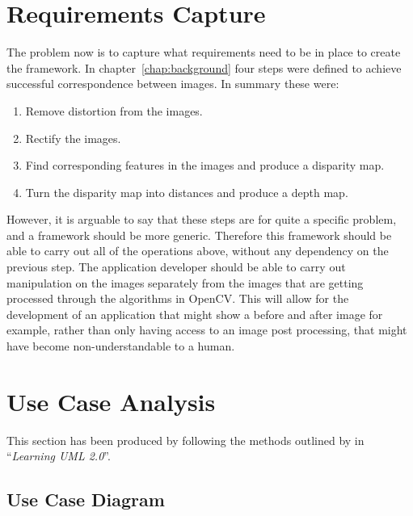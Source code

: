 \documentclass[11pt,oneside]{report}
\begin{document}
		\section{Requirements Capture}
			The problem now is to capture what requirements need to be in place to create the framework.
			In chapter~\ref{chap:background} four steps were defined to achieve successful correspondence between images.
			In summary these were:
			\begin{enumerate}
				\item Remove distortion from the images.
				\item Rectify the images.
				\item Find corresponding features in the images and produce a disparity map.
				\item Turn the disparity map into distances and produce a depth map.
			\end{enumerate}
			However, it is arguable to say that these steps are for quite a specific problem, and a framework should be more generic.
			Therefore this framework should be able to carry out all of the operations above, without any dependency on the previous step.
			The application developer should be able to carry out manipulation on the images separately from the images that are getting processed through the algorithms in OpenCV.
			This will allow for the development of an application that might show a before and after image for example, rather than only having access to an image post processing, that might have become non-understandable to a human.
			
		\section{Use Case Analysis}
		This section has been produced by following the methods outlined by  in ``\textit{Learning UML 2.0}''.
			\subsection{Use Case Diagram}
			
\end{document}
